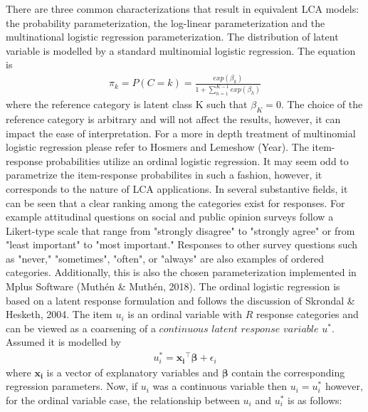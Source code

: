 There are three common characterizations that result in equivalent LCA models: the probability parameterization, the log-linear parameterization and the multinational logistic regression parameterization. The distribution of latent variable is modelled by a standard multinomial logistic regression. The equation is
\begin{align}
    \pi_{k} = P(C=k) = \frac{exp(\beta_{k})}{1 + \sum_{h=1}^{K-1}exp(\beta_{h})}
\end{align} where the reference category is latent class K such that $\beta_{K}=0$. The choice of the reference category is arbitrary and will not affect the results, however, it can impact the ease of interpretation. For a more in depth treatment of multinomial logistic regression please refer to Hosmers and Lemeshow (Year). The item-response probabilities utilize an ordinal logistic regression. It may seem odd to parametrize the item-response probabilites in such a fashion, however, it corresponds to the nature of LCA applications. In several substantive fields, it can be seen that a clear ranking among the categories exist for responses. For example attitudinal questions on social and public opinion surveys follow a Likert-type scale that range from "strongly disagree" to "strongly agree" or from "least important" to "most important." Responses to other survey questions such as "never," "sometimes", "often", or "always" are also examples of ordered categories. Additionally, this is also the chosen parameterization implemented in Mplus Software (Muth\'en \& Muth\'en, 2018). The ordinal logistic regression is based on a latent response formulation and follows the discussion of Skrondal \& Hesketh, 2004. The item $u_{i}$ is an ordinal variable with $R$ response categories and can be viewed as a coarsening of a $continuous$ $latent$ $response$ $variable$ $u^{*}$. Assumed it is modelled by 
\begin{align}
    u_{i}^{*} = \bm{x_{i}}^\intercal \bm{\beta} + \epsilon_{i}
\end{align} where $\bm{x_{i}}$ is a vector of explanatory variables and $\bm{\beta}$ contain the corresponding regression parameters. Now, if $u_{i}$ was a continuous variable then $u_{i} = u_{i}^{*}$ however, for the ordinal variable case, the relationship between $u_{i}$ and $u_{i}^{*}$ is as follows:
